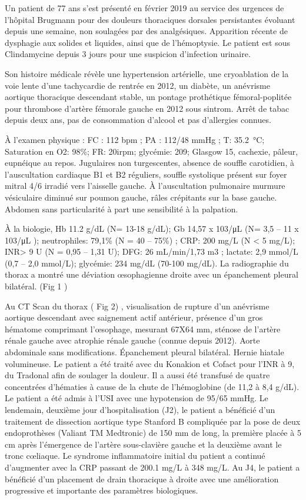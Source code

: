 \documentclass[./tfe]{subfiles}
\begin{document}
Un patient de 77 ans s’est présenté en février 2019 au service des urgences de l'hôpital Brugmann pour des douleurs thoraciques dorsales persistantes évoluant depuis une semaine, non soulagées par des analgésiques. Apparition récente de dysphagie aux solides et liquides, ainsi que de l’hémoptysie. Le patient est sous Clindamycine depuis 3 jours pour une suspicion d’infection urinaire.

Son histoire médicale révèle une hypertension artérielle, une cryoablation de la voie lente d’une tachycardie de rentrée en 2012, un diabète, un anévrisme aortique thoracique descendant stable, un pontage prothétique fémoral-poplitée pour thrombose d'artère fémorale gauche en 2012 sous sintrom. Arrêt de tabac depuis deux ans, pas de consommation d’alcool et pas d’allergies connues.

À l'examen physique : FC : 112 bpm ; PA : 112/48 mmHg ; T: \SI{35.2}{\celsius}; Saturation en O2: 98\%; FR: 20irpm; glycémie: 209; Glasgow 15, cachexie, pâleur, eupnéique au repos. Jugulaires non turgescentes, absence de souffle carotidien, à l’auscultation cardiaque B1 et B2 réguliers, souffle systolique présent sur foyer mitral 4/6 irradié vers l'aisselle gauche. À l’auscultation pulmonaire murmure vésiculaire diminué sur poumon gauche, râles crépitants sur la base gauche. Abdomen sans particularité à part une sensibilité à la palpation.

À la biologie, Hb 11.2 g/dL (N= 13-18 g/dL); Gb 14,57 x 103/\si{\micro\liter} (N= 3,5 – 11 x 103/\si{\micro\liter} ); neutrophiles: 79,1\% (N = 40 – 75\%) ; CRP: 200 mg/L (N < 5 mg/L); INR> 9 U (N = 0,95 – 1,31 U); DFG: 26 mL/min/1,73 m3 ; lactate: 2,9 mmol/L (0,7 – 2,0 mmol/L); glycémie: 234 mg/dL (70-100 mg/dL).
La radiographie du thorax a montré une déviation œsophagienne droite avec un épanchement pleural bilatéral. (Fig 1 )

Au CT Scan du thorax ( Fig 2) , visualisation de rupture d'un anévrisme aortique descendant avec saignement actif antérieur, présence d'un gros hématome comprimant l'œsophage, mesurant 67X64 mm, sténose de l'artère rénale gauche avec atrophie rénale gauche (connue depuis 2012). Aorte abdominale sans modifications. Épanchement pleural bilatéral. Hernie hiatale volumineuse. Le patient a été traité avec du Konakion et Cofact pour l’INR à 9, du Tradonal afin de soulager la douleur. Il a aussi été transfusé de quatre concentrées d’hématies à cause de la chute de l’hémoglobine (de 11,2 à 8,4 g/dL). Le patient a été admis à l'USI avec une hypotension de 95/65 mmHg. Le lendemain, deuxième jour d'hospitalisation (J2), le patient a bénéficié d'un traitement de dissection aortique type Stanford B compliquée par la pose de deux endoprothèses (Valiant TM Medtronic) de 150 mm de long, la première placée à 5 cm après l'émergence de l'artère sous-clavière gauche et la deuxième avant le tronc cœliaque. Le syndrome inflammatoire initial du patient a continué d’augmenter avec la CRP passant de 200.1 mg/L à 348 mg/L. Au J4, le patient a bénéficié d’un placement de drain thoracique à droite avec une amélioration progressive et importante des paramètres biologiques.
\end{document}
